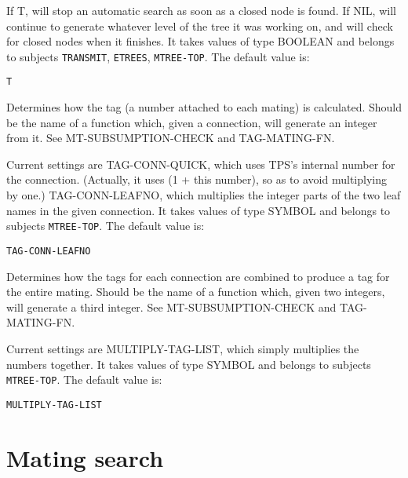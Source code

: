 \begin{description}
\item[MTREE-STOP-IMMEDIATELY]  
If T, will stop an automatic search as soon as a closed 
node is found. If NIL, will continue to generate whatever level of
the tree it was working on, and will check for closed nodes when
it finishes.
It takes values of type BOOLEAN and belongs to subjects \texttt{TRANSMIT}, \texttt{ETREES}, \texttt{MTREE-TOP}.  The default value is: \begin{lstlisting}
T
\end{lstlisting}

\item[TAG-CONN-FN]  
Determines how the tag (a number attached to each mating) is calculated.
Should be the name of a function which, given a connection, will generate an
integer from it. See MT-SUBSUMPTION-CHECK and TAG-MATING-FN.

Current settings are 
TAG-CONN-QUICK, which uses TPS's internal number for the connection. (Actually,
it uses (1 + this number), so as to avoid multiplying by one.)
TAG-CONN-LEAFNO, which multiplies the integer parts of the two leaf names
in the given connection.
It takes values of type SYMBOL and belongs to subjects \texttt{MTREE-TOP}.  The default value is: \begin{lstlisting}
TAG-CONN-LEAFNO
\end{lstlisting}

\item[TAG-MATING-FN]  
Determines how the tags for each connection are combined to produce
a tag for the entire mating.
Should be the name of a function which, given two integers, will generate a
third integer. See MT-SUBSUMPTION-CHECK and TAG-MATING-FN.

Current settings are 
MULTIPLY-TAG-LIST, which simply multiplies the numbers together.
It takes values of type SYMBOL and belongs to subjects \texttt{MTREE-TOP}.  The default value is: \begin{lstlisting}
MULTIPLY-TAG-LIST
\end{lstlisting}

\item
\end{description}

\section{Mating search}

